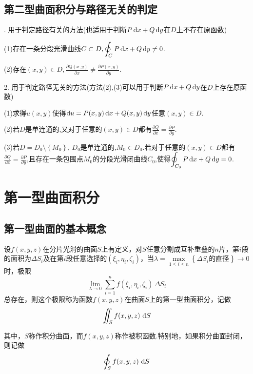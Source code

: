 \subsection{第二型曲面积分与路径无关的判定}
\vspace*{-1em}

. 用于判定路径有关的方法(也适用于判断$P\,{\rm{d}} x+Q\,{\rm{d}} y$在$D$上不存在原函数)
\par \quad \quad (1)\quad 存在一条分段光滑曲线$C\subset D,\displaystyle \oint_{C}P\,{\rm{d}} x+Q\,{\rm{d}} y\ne 0$.
\vspace*{1em}
\par \quad \quad (2)\quad 存在$(x,y)\in D,\displaystyle \frac{\partial Q(x,y)}{\partial x}\ne \frac{\partial P(x,y)}{\partial y}$.
\vspace*{1em}
\par 2. 用于判定路径无关的方法(方法(2),(3)可以用于判断$P\,{\rm{d}} x+Q\,{\rm{d}} y$在$D$上存在原函数)
\par \quad \quad (1)\quad 求得$u(x,y)$使得${\rm{d}} u=P(x,y)\,{\rm{d}} x+Q(x,y)\,{\rm{d}} y$任意$(x,y)\in D$.
\vspace*{1em}
\par \quad \quad (2)\quad 若$D$是单连通的,又对于任意的$(x,y)\in D$都有$\displaystyle\frac{\partial Q}{\partial x} =\frac{\partial P}{\partial y}$.
\vspace*{1em}
\par \quad \quad (3)\quad 若$D=D_0\setminus\left\lbrace M_0\right\rbrace,\,D_0 $是单连通的,$M_0\in D_0$.若对于任意的$(x,y)\in D$都有$\displaystyle\frac{\partial Q}{\partial x} =\frac{\partial P}{\partial y}$,且存在一条包围点$M_0$的分段光滑闭曲线$C_0$,使得$\displaystyle \oint_{C_0}P\,{\rm{d}} x+Q\,{\rm{d}} y= 0$.


\section{第一型曲面积分}
\subsection{第一型曲面的基本概念}
\vspace*{-1em}

设$f(x,y,z)$在分片光滑的曲面$S$上有定义，对$S$任意分割成互补重叠的$n$片，第$i$段的面积为$\Delta S_i$及在第$i$段任意选择的$(\xi_i,\eta_i,\zeta_i)$，当$\lambda = \max\limits_{1 \le i \le n} \left\lbrace \Delta S_i\mbox{的直径}\right\rbrace \rightarrow 0$时，极限
\begin{equation}
	\lim_{\lambda \rightarrow 0} \sum^{n}_{i=1} f(\xi_i,\eta_i,\zeta_i)\,\Delta S_i
\end{equation}
总存在，则这个极限称为函数$f(x,y,z)$在曲面$S$上的第一型曲面积分，记做
\begin{equation}
	\iint_{S}f(x,y,z)\,\,{\rm{d}} S
\end{equation}
\par 其中，$S$称作积分曲面，而$f(x,y,z)$称作被积函数.特别地，如果积分曲面封闭，则记做
\begin{equation}
	\oint_{S}f(x,y,z)\,\,{\rm{d}} S
\end{equation}

